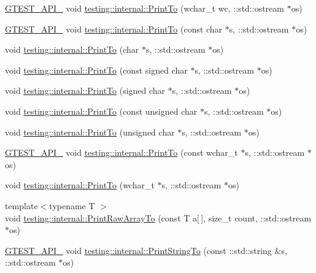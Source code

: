 \begin{DoxyCompactItemize}
\hyperlink{gtest-port_8h_aa73be6f0ba4a7456180a94904ce17790}{G\+T\+E\+S\+T\+\_\+\+A\+P\+I\+\_\+} void \hyperlink{namespacetesting_1_1internal_a6c50fd437a2ae2ff6f182ccd6c2744dd}{testing\+::internal\+::\+Print\+To} (wchar\+\_\+t wc, \+::std\+::ostream $\ast$os)
\item 
\hyperlink{gtest-port_8h_aa73be6f0ba4a7456180a94904ce17790}{G\+T\+E\+S\+T\+\_\+\+A\+P\+I\+\_\+} void \hyperlink{namespacetesting_1_1internal_ac226053b96d7d61f9407e3b75bab07d9}{testing\+::internal\+::\+Print\+To} (const char $\ast$s, \+::std\+::ostream $\ast$os)
\item 
void \hyperlink{namespacetesting_1_1internal_a553eec7bb50de01c9e91cac4accc606f}{testing\+::internal\+::\+Print\+To} (char $\ast$s, \+::std\+::ostream $\ast$os)
\item 
void \hyperlink{namespacetesting_1_1internal_a792cc5665a34619ed7a6d54711433456}{testing\+::internal\+::\+Print\+To} (const signed char $\ast$s, \+::std\+::ostream $\ast$os)
\item 
void \hyperlink{namespacetesting_1_1internal_a1320096b116f8cc4b688acbd5b783051}{testing\+::internal\+::\+Print\+To} (signed char $\ast$s, \+::std\+::ostream $\ast$os)
\item 
void \hyperlink{namespacetesting_1_1internal_a42c591f2164ad105b502a9262333aed2}{testing\+::internal\+::\+Print\+To} (const unsigned char $\ast$s, \+::std\+::ostream $\ast$os)
\item 
void \hyperlink{namespacetesting_1_1internal_a7fae797c500d66d0f5a9db4f205e3416}{testing\+::internal\+::\+Print\+To} (unsigned char $\ast$s, \+::std\+::ostream $\ast$os)
\item 
\hyperlink{gtest-port_8h_aa73be6f0ba4a7456180a94904ce17790}{G\+T\+E\+S\+T\+\_\+\+A\+P\+I\+\_\+} void \hyperlink{namespacetesting_1_1internal_afb038075e9e2166d1d9158a19e0eed23}{testing\+::internal\+::\+Print\+To} (const wchar\+\_\+t $\ast$s, \+::std\+::ostream $\ast$os)
\item 
void \hyperlink{namespacetesting_1_1internal_a8d41baa371fad3eb5a3dbe1bbc02c290}{testing\+::internal\+::\+Print\+To} (wchar\+\_\+t $\ast$s, \+::std\+::ostream $\ast$os)
\item 
{\footnotesize template$<$typename T $>$ }\\void \hyperlink{namespacetesting_1_1internal_ad3013b6b4c825edee9fe18ff1d982faa}{testing\+::internal\+::\+Print\+Raw\+Array\+To} (const T a\mbox{[}$\,$\mbox{]}, size\+\_\+t count, \+::std\+::ostream $\ast$os)
\item 
\hyperlink{gtest-port_8h_aa73be6f0ba4a7456180a94904ce17790}{G\+T\+E\+S\+T\+\_\+\+A\+P\+I\+\_\+} void \hyperlink{namespacetesting_1_1internal_a8b53e46cea3f8bdfc9342057c4f6ba62}{testing\+::internal\+::\+Print\+String\+To} (const \+::std\+::string \&s, \+::std\+::ostream $\ast$os)

\end{DoxyCompactItemize}
